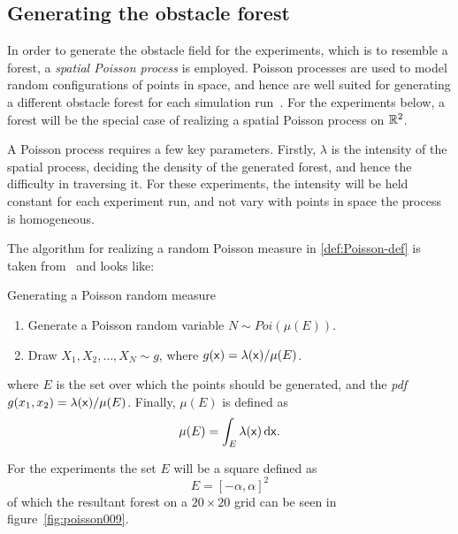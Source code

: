 \subsection{Generating the obstacle forest}
\label{sec:Poisson-Process}

In order to generate the obstacle field for the experiments, which is to
resemble a forest, a \textit{spatial Poisson process} is employed. Poisson
processes are used to model random configurations of points in space, and hence
are well suited for generating a different obstacle forest for each simulation
run~\cite{Kroese_2014}. For the experiments below, a forest will be the special
case of realizing a spatial Poisson process on \(\mathbb{R}^2\).

A Poisson process requires a few key parameters. Firstly, \(\lambda\) is the
intensity of the spatial process, deciding the density of the generated forest,
and hence the difficulty in traversing it. For these experiments, the intensity
will be held constant for each experiment run, and not vary with points in space
\ie the process is homogeneous.

The algorithm for realizing a random Poisson measure in \cref{def:Poisson-def}
is taken from~\cite[Definition~1.1.1][34]{Kroese_2014} and looks like:

\begin{definition}{Generating a Poisson random measure}
  \label{def:Poisson-def}
  \begin{enumerate}
  \item Generate a Poisson random variable \(N \sim Poi(\mu(E))\).
  \item Draw \(X_1,X_2,\ldots,X_N \sim g\), where \(g({\mathbf{\mathsf{x}}}) =
    \lambda({\mathbf{\mathsf{x}}})/ \mu(E)\).
  \end{enumerate}
\end{definition}
where \(E\) is the set over which the points should be generated, and the
\textit{pdf} \(g(x_1, x_2) = \lambda({\mathbf{\mathsf{x}}})/\mu(E)\). Finally, \(\mu(E)\) is
defined as
\[
  \mu(E) = \int_{E} \lambda({\mathbf{\mathsf{x}}})\, \mathrm{d} {\mathbf{\mathsf{x}}}.
\]

For the experiments the set \(E\) will be a square defined as
\[
  E = {[-\alpha, \alpha]}^2
\]
of which the resultant forest on a \(20 \times 20\) grid can be seen in
figure~\cref{fig:poisson009}.

